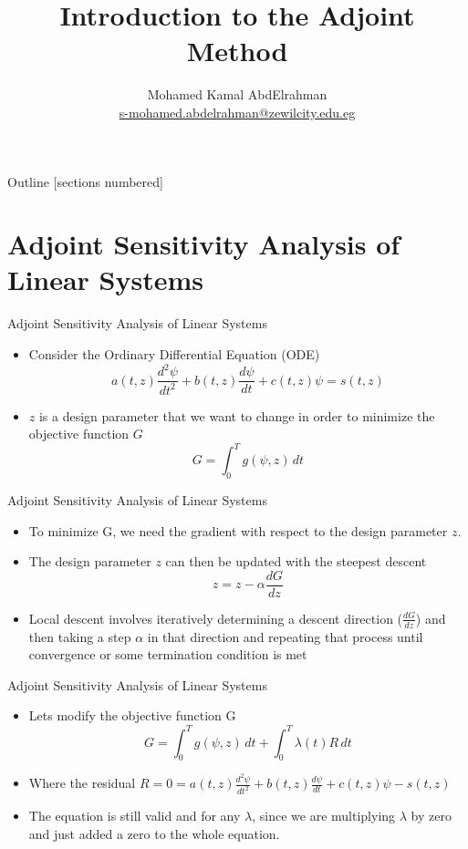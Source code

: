 \documentclass[10pt]{beamer}
\title{Introduction to the Adjoint Method}
\author{
	Mohamed Kamal AbdElrahman \\
 \href{my_email}{s-mohamed.abdelrahman@zewilcity.edu.eg}}
\institute{University of Science and Technology \\[10pt] Zewail City}
\date{}
\begin{document}
\begin{frame}
	\titlepage
\end{frame}
\begin{frame}{Outline}
	[sections numbered]
	\tableofcontents%
\end{frame}
\section{Adjoint Sensitivity Analysis of Linear Systems}
\begin{frame}{Adjoint Sensitivity Analysis of Linear Systems}
	\begin{itemize}
		\item  Consider the Ordinary Differential Equation (ODE)
		\begin{equation}
a(t,z)\frac{d^2 \psi}{dt^2} + b(t,z)\frac{d \psi}{dt} +c(t,z) \psi = s(t,z) 
		\end{equation}
\item $z$ is a design parameter that we want to change in order to minimize the objective function $G$
\begin{equation}
G = \int^{T}_0  g(\psi,z) \, dt
\end{equation}
	\end{itemize}
\end{frame}

\begin{frame}{Adjoint Sensitivity Analysis of Linear Systems}
	\begin{itemize}
	\item  To minimize G, we  need the gradient with respect to the design parameter $z$.
	
	\item The  design parameter $z$ can then be updated with the steepest descent 
	\begin{equation}
	z = z - \alpha \frac{dG}{dz}
	\end{equation}
	
	\item Local descent involves iteratively determining a descent direction ($ \frac{dG}{dz}$) and	then taking a step $\alpha$ in that direction and repeating that process until convergence or some termination condition is met
	\end{itemize}
\end{frame}

\begin{frame}{Adjoint Sensitivity Analysis of Linear Systems}
	\begin{itemize}
		\item  Lets modify the objective function G
		\begin{equation}
G =  \int^{T}_0  g(\psi,z) \, dt + \int^{T}_0 \lambda(t) R \, dt 
		\end{equation}
		\item Where the residual $R = 0 =  a(t,z)\frac{d^2 \psi}{dt^2} + b(t,z)\frac{d \psi}{dt} +c(t,z) \psi- s(t,z) $
		\item The  equation is still valid and for any $\lambda$, since we are multiplying $\lambda$ by zero and just added a zero to the whole equation. 
	\end{itemize}
\end{frame}
\end{document}
